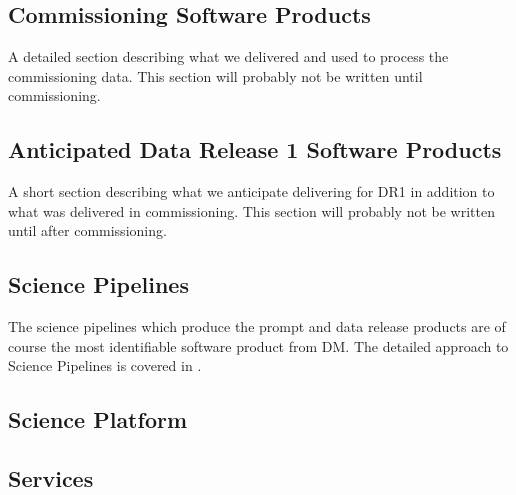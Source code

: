 \subsection{Commissioning Software Products}
A detailed section describing what we delivered and used to process the commissioning data.
This section will probably not be written until  commissioning.

\subsection{Anticipated Data Release 1 Software Products}
A short section describing what we anticipate delivering  for DR1 in addition to what was delivered in commissioning.
This section will probably not be written until after commissioning.

\subsection{Science Pipelines}\label{sec:pipes}
The science pipelines which produce the prompt and data release products are of course the most identifiable
software product from DM.
The detailed approach to Science Pipelines is covered in \cite{PSTN-019}.


\subsection{Science Platform}

\subsection{Services}
